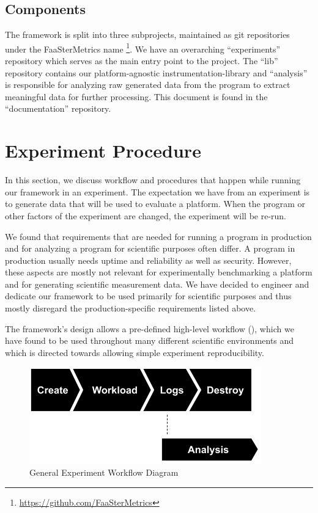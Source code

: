 \documentclass[../main.tex]{subfiles}
\begin{document}
\subsection{Components}%
\label{sub:frameworkComponents}

The framework is split into three subprojects, maintained as git repositories under the FaaSterMetrics name%
\footnote{\url{https://github.com/FaaSterMetrics}}. 
We have an overarching ``experiments'' repository which serves as the main entry point to the project.
The ``lib'' repository contains our platform-agnostic instrumentation-library
and ``analysis'' is responsible for analyzing raw generated data from the program to extract meaningful data for further processing.  
This document is found in the ``documentation'' repository.

\section{Experiment Procedure}%
\label{sec:experimentProcedure}

In this section, we discuss workflow and procedures that happen while running our framework in an experiment. 
The expectation we have from an experiment is to generate data that will be used to evaluate a platform. 
When the program or other factors of the experiment are changed, the experiment will be re-run.

We found that requirements that are needed for running a program in production and 
for analyzing a program for scientific purposes often differ. 
A program in production usually needs uptime and reliability as well as security. 
However, these aspects are mostly not relevant for experimentally benchmarking a platform and for generating scientific measurement data. 
We have decided to engineer and dedicate our framework to be used primarily for scientific purposes
and thus mostly disregard the production-specific requirements listed above.

The framework's design allows a pre-defined high-level workflow (),
which we have found to be used throughout many different scientific environments 
and which is directed towards allowing simple experiment reproducibility.

\begin{figure}
\begin{center}
  \includegraphics[width=\linewidth,keepaspectratio]{./workflow-diagram.png}
\end{center}
\caption{General Experiment Workflow Diagram}%
\label{fig:experimentWorkflowDiagram}
\end{figure}
\end{document}
